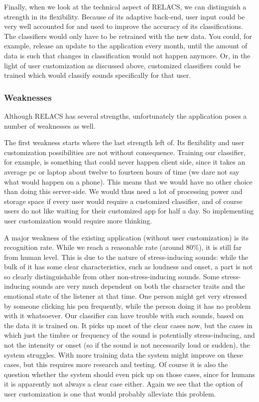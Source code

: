 \documentclass[a4paper]{article}
\begin{document}
Finally, when we look at the technical aspect of RELACS, we can distinguish a strength in its flexibility.
Because of its adaptive back-end, user input could be very well accounted for and used to improve the accuracy of its classifications.
The classifiers would only have to be retrained with the new data.
You could, for example, release an update to the application every month, until the amount of data is such that changes in classification would not happen anymore.
Or, in the light of user customization as discussed above, customized classifiers could be trained which would classify sounds specifically for that user.

\subsubsection{Weaknesses}
Although RELACS has several strengths, unfortunately the application poses a number of weaknesses as well.

The first weakness starts where the last strength left of.
Its flexibility and user customization possibilities are not without consequence.
Training our classifier, for example, is something that could never happen client side, since it takes an average pc or laptop about twelve to fourteen hours of time (we dare not say what would happen on a phone).
This means that we would have no other choice than doing this server-side.
We would thus need a lot of processing power and storage space if every user would require a customized classifier, and of course users do not like waiting for their customized app for half a day.
So implementing user customization would require more thinking.

A major weakness of the existing application (without user customization) is its recognition rate.
While we reach a reasonable rate (around 80\%), it is still far from human level.
This is due to the nature of stress-inducing sounds:
while the bulk of it has some clear characteristics, such as loudness and onset, a part is not so clearly distinguishable from other non-stress-inducing sounds.
Some stress-inducing sounds are very much dependent on both the character traits and the emotional state of the listener at that time.
One person might get very stressed by someone clicking his pen frequently, while the person doing it has no problem with it whatsoever.
Our classifier can have trouble with such sounds, based on the data it is trained on.
It picks up most of the clear cases now,
but the cases in which just the timbre or frequency of the sound is potentially stress-inducing, and not the intensity or onset (so if the sound is not necessarily loud or sudden), the system struggles.
With more training data the system might improve on these cases, but this requires more research and testing.
Of course it is also the question whether the system should even pick up on those cases, since for humans it is apparently not always a clear case either.
Again we see that the option of user customization is one that would probably alleviate this problem.
\end{document}
